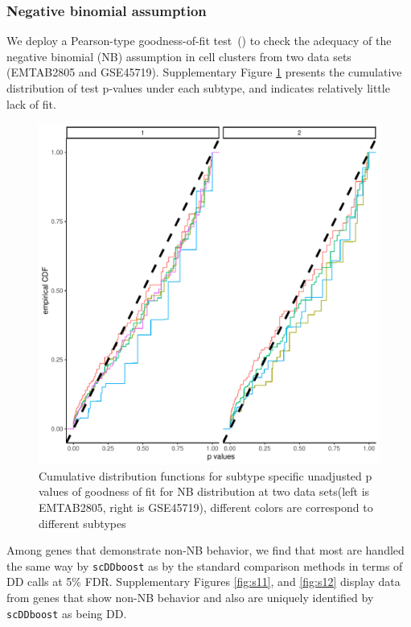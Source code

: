 \documentclass[aoas,preprint]{imsart}
\begin{document}
\subsubsection{Negative binomial assumption}

We deploy a Pearson-type goodness-of-fit test~(\cite{Yin:2013aa}) to check the adequacy of the
negative binomial (NB) assumption in cell clusters from two data sets (EMTAB2805 and GSE45719).
Supplementary Figure \ref{fig:nb} presents the cumulative distribution of test p-values under each subtype, and
indicates relatively little lack of fit.
\begin{figure}[h!]
  \includegraphics[width=\linewidth]{Figs/nbfit.pdf}
  \caption{Cumulative distribution functions for subtype specific unadjusted p values of goodness of fit for NB distribution at two data sets(left is EMTAB2805, right is GSE45719), different colors are correspond to different subtypes}
  \label{fig:nb}
\end{figure}
Among genes that demonstrate non-NB behavior, we find that most are handled the same way by \texttt{scDDboost}
as by the standard comparison methods in terms of DD calls at 5\% FDR.  
 Supplementary Figures \ref{fig:s11}, and \ref{fig:s12} display data from genes that show non-NB behavior
and also are uniquely identified by \texttt{scDDboost} as being DD.   
\end{document}
